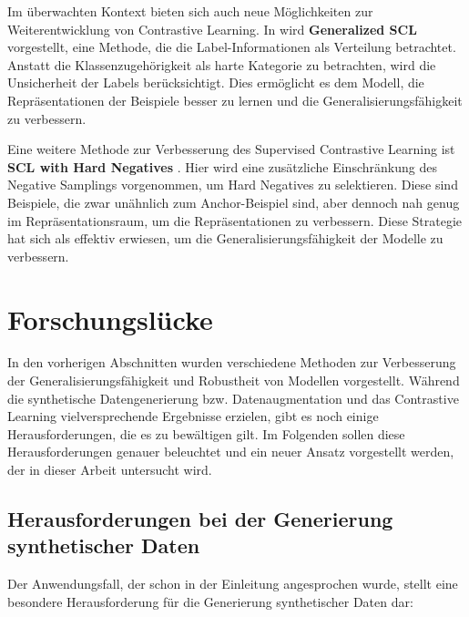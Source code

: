 Im überwachten Kontext bieten sich auch neue Möglichkeiten zur Weiterentwicklung von Contrastive Learning. In \parencite{Kim2023generalizedsupcon} wird \textbf{Generalized SCL} vorgestellt, eine Methode, die die Label-Informationen als Verteilung betrachtet. Anstatt die Klassenzugehörigkeit als harte Kategorie zu betrachten, wird die Unsicherheit der Labels berücksichtigt. Dies ermöglicht es dem Modell, die Repräsentationen der Beispiele besser zu lernen und die Generalisierungsfähigkeit zu verbessern.

Eine weitere Methode zur Verbesserung des Supervised Contrastive Learning ist \textbf{SCL with Hard Negatives} \parencite{Jiang2024supconhardnegatives}. Hier wird eine zusätzliche Einschränkung des Negative Samplings vorgenommen, um Hard Negatives zu selektieren. Diese sind Beispiele, die zwar unähnlich zum Anchor-Beispiel sind, aber dennoch nah genug im Repräsentationsraum, um die Repräsentationen zu verbessern. Diese Strategie hat sich als effektiv erwiesen, um die Generalisierungsfähigkeit der Modelle zu verbessern.

\section{Forschungslücke} \label{sec:research-gap}

In den vorherigen Abschnitten wurden verschiedene Methoden zur Verbesserung der Generalisierungsfähigkeit und Robustheit von Modellen vorgestellt. Während die synthetische Datengenerierung bzw. Datenaugmentation und das Contrastive Learning vielversprechende Ergebnisse erzielen, gibt es noch einige Herausforderungen, die es zu bewältigen gilt. Im Folgenden sollen diese Herausforderungen genauer beleuchtet und ein neuer Ansatz vorgestellt werden, der in dieser Arbeit untersucht wird.

\subsection{Herausforderungen bei der Generierung synthetischer Daten} \label{sec:challenges-synt-data}

Der Anwendungsfall, der schon in der Einleitung angesprochen wurde, stellt eine besondere Herausforderung für die Generierung synthetischer Daten dar:

